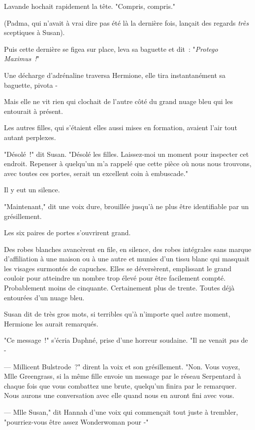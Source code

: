 Lavande hochait rapidement la tête. "Compris, compris."

(Padma, qui n'avait à vrai dire pas été là la dernière fois, lançait des regards \emph{très} sceptiques à Susan).

Puis cette dernière se figea sur place, leva sa baguette et dit~: "\emph{Protego Maximus~!}"

Une décharge d'adrénaline traversa Hermione, elle tira instantanément sa baguette, pivota -

Mais elle ne vit rien qui clochait de l'autre côté du grand nuage bleu qui les entourait à présent.

Les autres filles, qui s'étaient elles aussi mises en formation, avaient l'air tout autant perplexes.

"Désolé~!" dit Susan. "Désolé les filles. Laissez-moi un moment pour inspecter cet endroit. Repenser à quelqu'un m'a rappelé que cette pièce où nous nous trouvons, avec toutes ces portes, serait un excellent coin à embuscade."

Il y eut un silence.

"Maintenant," dit une voix dure, brouillée jusqu'à ne plus être identifiable par un grésillement.

Les six paires de portes s'ouvrirent grand.

Des robes blanches avancèrent en file, en silence, des robes intégrales sans marque d'affiliation à une maison ou à une autre et munies d'un tissu blanc qui masquait les visages surmontés de capuches. Elles se déversèrent, emplissant le grand couloir pour atteindre un nombre trop élevé pour être facilement compté. Probablement moins de cinquante. Certainement plus de trente. Toutes déjà entourées d'un nuage bleu.

Susan dit de très gros mots, si terribles qu'à n'importe quel autre moment, Hermione les aurait remarqués.

"Ce message~!" s'écria Daphné, prise d'une horreur soudaine. "Il ne venait \emph{pas} de -

--- Millicent Bulstrode~?" dirent la voix et son grésillement. "Non. Vous voyez, Mlle Greengrass, si la même fille envoie un message par le réseau Serpentard à chaque fois que vous combattez une brute, quelqu'un finira par le remarquer. Nous aurons une conversation avec elle quand nous en auront fini avec vous.

--- Mlle Susan," dit Hannah d'une voix qui commençait tout juste à trembler, "pourriez-vous être assez Wonderwoman pour -"

